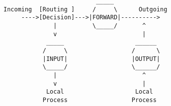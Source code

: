 \documentclass{article}
\begin{document}
\pagestyle{empty}

\begin{verbatim}
                          _____
Incoming  [Routing ]     /     \      Outgoing
     ---->[Decision]--->|FORWARD|---------->
              |          \_____/       ^
              v                        |
            _____                    ______
           /     \                  /      \
           |INPUT|                  |OUTPUT|
           \_____/                  \______/
              |                        ^
              v                        |
            Local                    Local
           Process                  Process
\end{verbatim}
\end{document}
